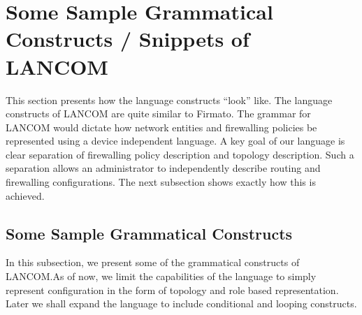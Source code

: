 \section {Some Sample Grammatical Constructs / Snippets of LANCOM}
 \label {sec:grammatical_snippets}

This section presents how the language constructs ``look'' like.
  The language constructs of LANCOM are quite similar to Firmato.
  The grammar for LANCOM would dictate how network entities and firewalling
  policies be represented using a device independent language.
  A key goal of our language is clear separation of firewalling policy
  description and topology description.
  Such a separation allows an administrator to independently describe routing
  and firewalling configurations.
  The next subsection shows exactly how this is achieved. 

\subsection{Some Sample Grammatical Constructs}

In this subsection,
  we present some of the grammatical constructs of LANCOM.As of now,
  we limit the capabilities of the language to simply represent configuration
  in the form of topology and role based representation.
  Later we shall expand the language to include conditional and looping
  constructs. \\ 


